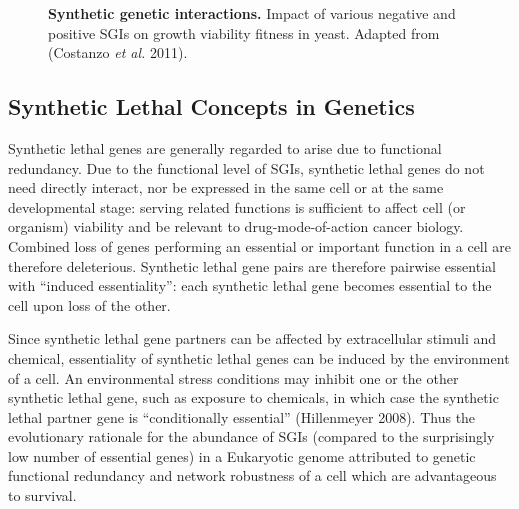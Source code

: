 \begin{figure}[!ht]
   \centering
   \caption[Synthetic genetic interactions]{\textbf{Synthetic genetic interactions.} Impact of various negative and positive SGIs on growth viability fitness in yeast. Adapted from (Costanzo\textit{ et al.} 2011).}
\label{fig:Costanzo2011}
\end{figure}

\subsection{Synthetic Lethal Concepts in Genetics}

Synthetic lethal genes are generally regarded to arise due to functional redundancy. Due to the functional level of SGIs, synthetic lethal genes do not need directly interact, nor be expressed in the same cell or at the same developmental stage: serving related functions is sufficient to affect cell (or organism) viability and be relevant to drug-mode-of-action cancer biology. Combined loss of genes performing an essential or important function in a cell are therefore deleterious. Synthetic lethal gene pairs are therefore pairwise essential with ``induced essentiality'': each synthetic lethal gene becomes essential to the cell upon loss of the other.

Since synthetic lethal gene partners can be affected by extracellular stimuli and chemical, essentiality of synthetic lethal genes can be induced by the environment of a cell.  An environmental stress conditions may inhibit one or the other synthetic lethal gene, such as exposure to chemicals, in which case the synthetic lethal partner gene is ``conditionally essential'' (Hillenmeyer 2008). Thus the evolutionary rationale for the abundance of SGIs (compared to the surprisingly low number of essential genes) in a Eukaryotic genome attributed to genetic functional redundancy and network robustness of a cell which are advantageous to survival. 

